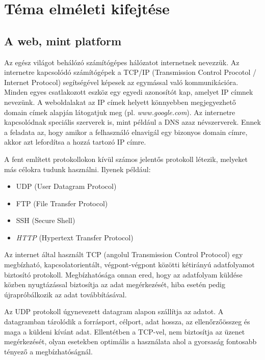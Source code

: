 \documentclass[
]{thesis-ekf}
\theoremstyle{definition}
\theoremstyle{remark}
\begin{document}
\chapter{Téma elméleti kifejtése}
\section{A web, mint platform}
Az egész világot behálózó számítógépes hálózatot internetnek nevezzük. Az internetre kapcsolódó számítógépek a TCP/IP (Transmission Control Procotol / Internet Protocol) segítségével képesek az egymással való kommunikációra. Minden egyes csatlakozott eszköz egy egyedi azonosítót kap, amelyet IP címnek nevezünk.
A weboldalakat az IP címek helyett könnyebben megjegyezhető domain címek alapján látogatjuk meg (pl. \emph{www.google.com}). Az internetre kapcsolódnak speciális szerverek is, mint például a DNS azaz névszerverek. Ennek a feladata az, hogy amikor a felhasználó elnavigál egy bizonyos domain címre, akkor azt lefordítsa a hozzá tartozó IP címre.

A fent említett protokollokon kívül számos jelentős protokoll létezik, melyeket más célokra tudunk használni. Ilyenek például:
\begin{itemize}
	\item UDP (User Datagram Protocol)
	\item FTP (File Transfer Protocol)
	\item SSH (Secure Shell)
	\item \emph{HTTP} (Hypertext Transfer Protocol)
\end{itemize}

Az internet által használt TCP (angolul Transmission Control Protocol) egy megbízható, kapcsolatorientált, végpont-végpont közötti kétirányú adatfolyamot biztosító protokoll. Megbízhatósága onnan ered, hogy az adatfolyam küldése közben nyugtázással biztosítja az adat megérkezését, hiba esetén pedig újrapróbálkozik az adat továbbításával.

Az UDP protokoll úgynevezett datagram alapon szállítja az adatot. A datagramban tárolódik a forrásport, célport, adat hossza, az ellenőrzőösszeg és maga a küldeni kívánt adat. Ellentétben a TCP-vel, nem biztosítja az üzenet megérkezését, olyan esetekben optimális a használata ahol a gyorsaság fontosabb tényező a megbízhatóságnál.
\end{document}
